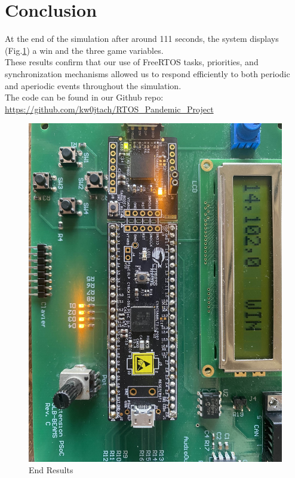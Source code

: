 \documentclass[a4paper, twoside, 12pt]{article}
\begin{document}
\newpage
\section{Conclusion}

At the end of the simulation after around 111 seconds, the system displays (Fig.\ref{fig:end_results}) a win and the three game variables.\\
These results confirm that our use of FreeRTOS tasks, priorities, and synchronization mechanisms allowed us to respond efficiently to both periodic and aperiodic events throughout the simulation.\\
The code can be found in our Github repo: \url{https://github.com/kw0jtach/RTOS_Pandemic_Project}



\begin{figure}[ht!]
	\centering
	\includegraphics[width=0.5\linewidth, angle=90]{img/end_results.jpg}
	\caption{End Results}
	\label{fig:end_results}
\end{figure}

\nocite{*}
\end{document}
